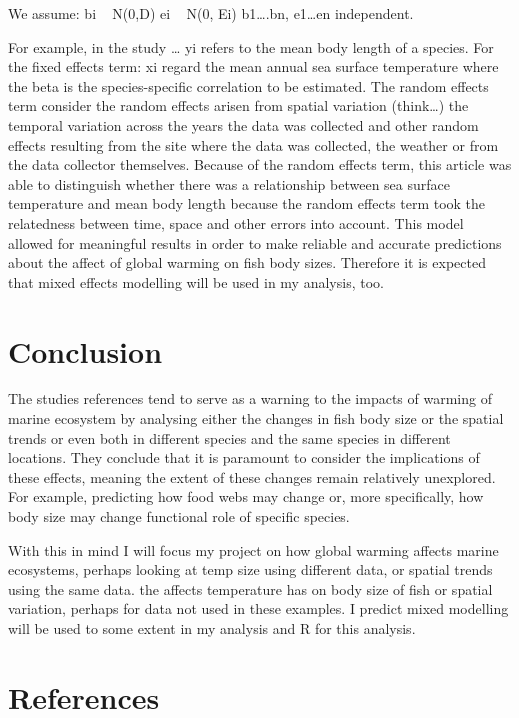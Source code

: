 \documentclass{article}
\begin{document}
We assume: 
bi ~ N(0,D)
ei ~ N(0, Ei)
b1….bn,  e1…en independent.

For example, in the study … yi refers to the mean body length of a species. For the fixed effects term: xi regard the mean annual sea surface temperature where the beta is the species-specific correlation to be estimated. The random effects term consider the random effects arisen from spatial variation (think…) the temporal variation across the years the data was collected and other random effects resulting from the site where the data was collected, the weather or from the data collector themselves. Because of the random effects term, this article was able to distinguish whether there was a relationship between sea surface temperature and mean body length because the random effects term took the relatedness between time, space and other errors into account. This model allowed for meaningful results in order to make reliable and accurate predictions about the affect of global warming on fish body sizes. Therefore it is expected that mixed effects modelling will be used in my analysis, too.

\section{Conclusion}

The studies references tend to serve as a warning to the impacts of warming of marine ecosystem by analysing either the changes in fish body size or the spatial trends or even both in different species and the same species in different locations. They conclude that it is paramount to consider the implications of these effects, meaning the extent of these changes remain relatively unexplored. For example, predicting how food webs may change or, more specifically, how body size may change functional role of specific species.

With this in mind I will focus my project on how global warming affects marine ecosystems, perhaps looking at temp size using different data, or spatial trends using the same data. the affects temperature has on body size of fish or spatial variation, perhaps for data not used in these examples. I predict mixed modelling will be used to some extent in my analysis and R for this analysis. 

\section*{References}
\begin{biblist}



\end{biblist}
\end{document}
